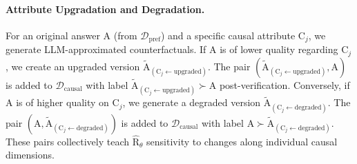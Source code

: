 \paragraph{Attribute Upgradation and Degradation.}
For an original answer $\mathrm{A}$ (from $\mathcal{D}_{\mathrm{pref}}$) and a specific causal attribute $\mathrm{C}_j$, we generate LLM-approximated counterfactuals.
If $\mathrm{A}$ is of lower quality regarding $\mathrm{C}_j$, we create an upgraded version $\tilde{\mathrm{A}}_{(\mathrm{C}_j \leftarrow \text{upgraded})}$. The pair $(\tilde{\mathrm{A}}_{(\mathrm{C}_j \leftarrow \text{upgraded})}, \mathrm{A})$ is added to $\mathcal{D}_{\mathrm{causal}}$ with label $\tilde{\mathrm{A}}_{(\mathrm{C}_j \leftarrow \text{upgraded})} \succ \mathrm{A}$ post-verification.
Conversely, if $\mathrm{A}$ is of higher quality on $\mathrm{C}_j$, we generate a degraded version $\tilde{\mathrm{A}}_{(\mathrm{C}_j \leftarrow \text{degraded})}$. The pair $(\mathrm{A}, \tilde{\mathrm{A}}_{(\mathrm{C}_j \leftarrow \text{degraded})})$ is added to $\mathcal{D}_{\mathrm{causal}}$ with label $\mathrm{A} \succ \tilde{\mathrm{A}}_{(\mathrm{C}_j \leftarrow \text{degraded})}$.
These pairs collectively teach $\hat{\mathrm{R}}_\theta$ sensitivity to changes along individual causal dimensions.







